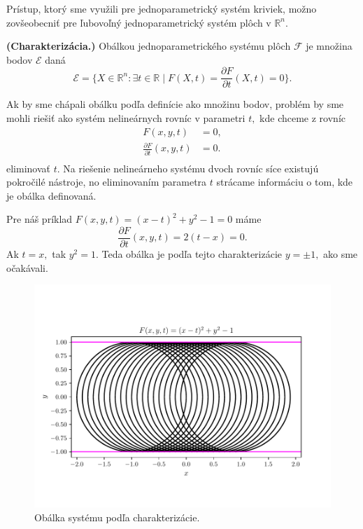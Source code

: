 Prístup, ktorý sme využili pre jednoparametrický systém kriviek, možno zovšeobecniť pre ľubovoľný jednoparametrický systém plôch v $\mathbb{R}^n.$

\begin{definition}{\textbf{\textup{(Charakterizácia.)}}}
\label{charakterizacia}
Obálkou jednoparametrického systému plôch $ \mathcal{F} $ je množina bodov $\mathcal{E}$ daná
$$\mathcal{E} = \{ X \in \mathbb{R}^{n} \colon \exists t \in \mathbb{R} \mid F(X, t) = \frac{\partial F}{\partial t}(X, t) = 0 \}.$$
\end{definition}

Ak by sme chápali obálku podľa definície ako množinu bodov, problém by sme mohli riešiť ako systém nelineárnych rovníc v parametri $t,$ kde chceme z rovníc 
\begin{align*}
F(x,y,t) &= 0, \\
\frac{\partial F}{\partial t}(x, y, t) &= 0. \\
\end{align*}
eliminovať $t.$ Na riešenie nelineárneho systému dvoch rovníc síce existujú pokročilé nástroje, no eliminovaním parametra $t$ strácame informáciu o tom, kde je obálka definovaná. 

\begin{example}
Pre náš príklad $ F(x, y, t) = (x - t)^2 + y^2 - 1 = 0 $ máme 
$$\frac{\partial F}{\partial t}(x, y, t) = 2(t-x) = 0. $$
Ak $t = x, $ tak $y^2 = 1.$ Teda obálka je podľa tejto charakterizácie $ y = \pm 1, $ ako sme očakávali.
\end{example}

\begin{figure}[H]
	\centering
	\includegraphics[trim={0 1.65cm 0 2cm},clip]{images/system_with_envelope_unlimited_domain.pdf}
	\caption{Obálka systému podľa charakterizácie.}
	\label{fig:system_with_envelope_unlimited_domain}
\end{figure}

